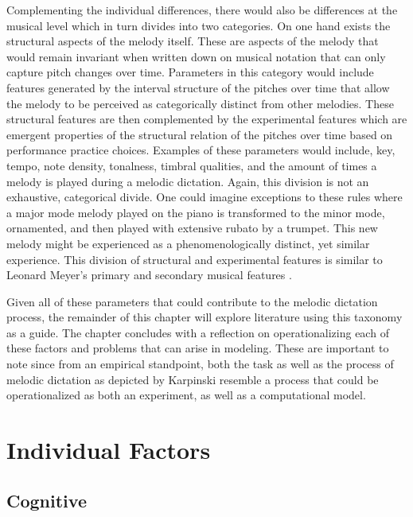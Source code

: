 \documentclass[12pt,]{book}
\begin{document}
Complementing the individual differences, there would also be differences at the musical level which in turn divides into two categories.
On one hand exists the structural aspects of the melody itself.
These are aspects of the melody that would remain invariant when written down on musical notation that can only capture pitch changes over time.
Parameters in this category would include features generated by the interval structure of the pitches over time that allow the melody to be perceived as categorically distinct from other melodies.
These structural features are then complemented by the experimental features which are emergent properties of the structural relation of the pitches over time based on performance practice choices.
Examples of these parameters would include, key, tempo, note density, tonalness, timbral qualities, and the amount of times a melody is played during a melodic dictation.
Again, this division is not an exhaustive, categorical divide.
One could imagine exceptions to these rules where a major mode melody played on the piano is transformed to the minor mode, ornamented, and then played with extensive rubato by a trumpet.
This new melody might be experienced as a phenomenologically distinct, yet similar experience.
This division of structural and experimental features is similar to Leonard Meyer's primary and secondary musical features \citep{meyerEmotionMeaningMusic1956}.

Given all of these parameters that could contribute to the melodic dictation process, the remainder of this chapter will explore literature using this taxonomy as a guide.
The chapter concludes with a reflection on operationalizing each of these factors and problems that can arise in modeling.
These are important to note since from an empirical standpoint, both the task as well as the process of melodic dictation as depicted by Karpinski resemble a process that could be operationalized as both an experiment, as well as a computational model.

\hypertarget{individual-factors}{%
\section{Individual Factors}\label{individual-factors}}

\hypertarget{cognitive}{%
\subsection{Cognitive}\label{cognitive}}
\end{document}

